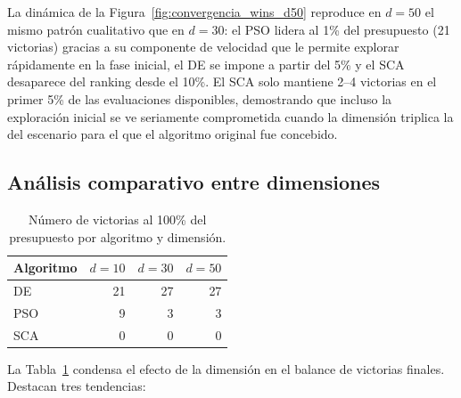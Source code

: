 \documentclass[12pt,a4paper]{article}
\begin{document}
La dinámica de la Figura~\ref{fig:convergencia_wins_d50} reproduce en $d=50$ el mismo patrón cualitativo que en $d=30$: el PSO lidera al 1\% del presupuesto (21 victorias) gracias a su componente de velocidad que le permite explorar rápidamente en la fase inicial, el DE se impone a partir del 5\% y el SCA desaparece del ranking desde el 10\%. El SCA solo mantiene 2--4 victorias en el primer 5\% de las evaluaciones disponibles, demostrando que incluso la exploración inicial se ve seriamente comprometida cuando la dimensión triplica la del escenario para el que el algoritmo original fue concebido.
 
\subsection{Análisis comparativo entre dimensiones}
 
\begin{table}[H]
\centering
\caption{Número de victorias al 100\% del presupuesto por algoritmo y dimensión.}
\label{tab:comparativa_dims}
\renewcommand{\arraystretch}{1.2}
\begin{tabular}{lrrr}
\toprule
\textbf{Algoritmo} & $d=10$ & $d=30$ & $d=50$ \\
\midrule
DE  & 21 & 27 & 27 \\
PSO &  9 &  3 &  3 \\
SCA &  0 &  0 &  0 \\
\bottomrule
\end{tabular}
\end{table}
 
La Tabla~\ref{tab:comparativa_dims} condensa el efecto de la dimensión en el balance de victorias finales. Destacan tres tendencias:
 
\end{document}
